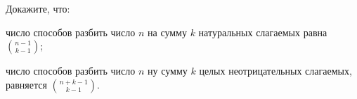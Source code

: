 Докажите, что:
\begin{enumcyr}
    \item число способов разбить число $n$ на сумму $k$ натуральных слагаемых равна $\binom{n - 1}{k - 1}$;
    \item число способов разбить число $n$ ну сумму $k$ целых неотрицательных слагаемых, равняется $\binom{n + k - 1}{k - 1}$. 
\end{enumcyr}